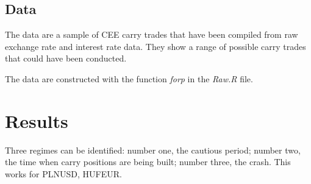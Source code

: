 \documentclass[12pt, a4paper, oneside]{article} %
\begin{document}
\subsection{Data}
The data are a sample of CEE carry trades that have been compiled from raw exchange rate and interest rate data.  They show a range of possible carry trades that could have been conducted. 

The data are constructed with the function \emph{forp} in the \emph{Raw.R} file.  

\section{Results}
Three regimes can be identified: number one, the cautious period; number two, the time when carry positions are being built; number three, the crash.  This works for PLNUSD, HUFEUR. 
\end{document}
